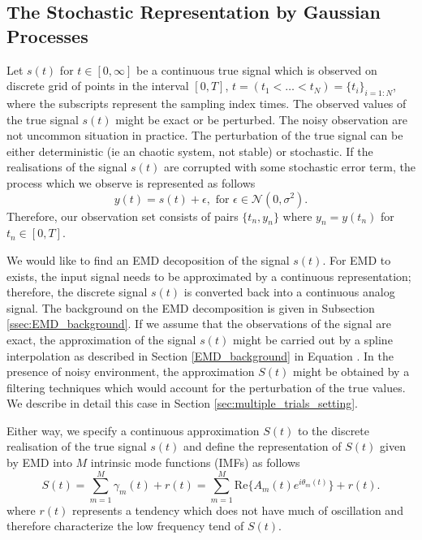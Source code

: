 \subsection{The Stochastic Representation by Gaussian Processes}
Let $s(t)$ for $t\in [0,\infty]$ be a continuous true signal which is observed on discrete grid of points in the interval $[0,T]$, $t =( t_1 < \dots <t_N ) = \{ t_i \}_{i=1:N}$, where the subscripts represent the sampling index times. The observed values of the true signal $s(t)$ might be exact or be perturbed. The noisy observation are not uncommon situation in practice. The perturbation of the true signal can be either deterministic (ie an chaotic system, not stable) or stochastic.  If the realisations of the signal $s(t)$ are corrupted with some stochastic error term, the process which we observe is represented as follows
\begin{equation}\label{eq:signal_noisy_y}
y(t) = s(t) + \epsilon, \text{ for } \epsilon \in \mathcal{N}(0, \sigma^2).
\end{equation}
Therefore, our observation set consists of pairs $\big\{t_n,y_n\big\}$ where $y_n = y(t_n)$ for $t_n \in [0,T]$. 

We would like to find an EMD decoposition of the signal $s(t)$. For EMD to exists, the input signal needs to be approximated by a continuous representation; therefore, the discrete signal $s(t)$ is converted back into a continuous analog signal. The background on the EMD decomposition is given in Subsection \ref{ssec:EMD_background}. If we assume that the observations of the signal are exact, the approximation of the signal $s(t)$ might be carried out by a spline interpolation as described in Section \ref{EMD_background} in Equation \label{cubic_spl}. In the presence of noisy environment, the approximation $S(t)$ might be obtained by a filtering techniques which would account for the perturbation of the true values. We describe in detail this case in Section \ref{sec:multiple_trials_setting}.  

Either way, we specify a continuous approximation $S(t)$ to the discrete realisation of the true signal $s(t)$ and define the representation of $S(t)$ given by EMD into $M$ intrinsic mode functions (IMFs) as follows 
\begin{equation}\label{eq:model_x_EMD}
S(t) = \sum_{m = 1}^M \gamma_m(t) + r(t) = \sum_{m = 1}^M \text{Re}\Big\{ A_m(t)  e^{i \theta_m(t)} \Big\} + r(t).
\end{equation}
where $r(t)$ represents a tendency which does not have much of oscillation and therefore characterize the low frequency tend of $S(t)$. 

